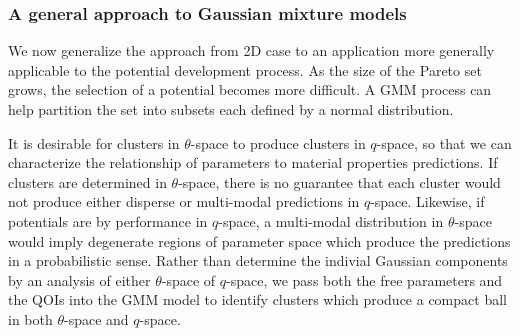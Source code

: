 \subsubsection{A general approach to Gaussian mixture models}

We now generalize the approach from 2D case to an application more generally applicable to the potential development process.  As the size of the Pareto set grows, the selection of a potential becomes more difficult.  A GMM process can help partition the set into subsets each defined by a normal distribution.

It is desirable for clusters in $\theta$-space to produce clusters in $q$-space, so that we can characterize the relationship of parameters to material properties predictions.  If clusters are determined in $\theta$-space, there is no guarantee that each cluster would not produce either disperse or multi-modal predictions in $q$-space.  Likewise, if potentials are by performance in $q$-space, a multi-modal distribution in $\theta$-space would imply degenerate regions of parameter space which produce the predictions in a probabilistic sense.  Rather than determine the indivial Gaussian components by an analysis of either $\theta$-space of $q$-space, we pass both the free parameters and the QOIs into the GMM model to identify clusters which produce a compact ball in both $\theta$-space and $q$-space.

